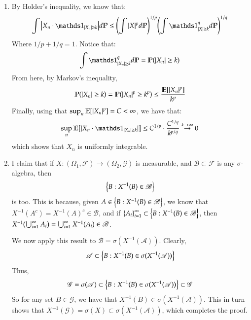 \documentclass[12pt]{article}
\theoremstyle{definitionstyle}
\def\mbb#1{\mathbb{#1}}
\newcommand{\SET}[1]{\Set{\mskip-\medmuskip #1 \mskip-\medmuskip}}
\newcommand{\1}{\mathds 1}
\renewcommand{\P}{\mathbb P \qty}
\newcommand{\E}{\mathbb E \qty}
\begin{document}
\begin{enumerate}
        \item By Holder's inequality, we know that:
        \begin{align*}
            \int \qty|X_n \cdot \1_{|X_n| \geq k}|d \mbb P \leq \qty(\int |X|^p d \mbb P)^{1/p} \qty(\int \1_{|X| \geq k}^q d\mbb P)^{1/q}
        \end{align*}
        Where $1/p + 1/q = 1$. Notice that:
        \begin{align*}
            \int \1_{|X_n| \geq k}^q d\mbb P = \P(|X_n| \geq k)
        \end{align*}
        From here, by Markov's inequality,
        \begin{align*}
            \P(|X_n| \geq k) = \P(|X_n|^p \geq k^p) \leq \frac{\E[|X_n|^p]}{k^p}
        \end{align*}
        Finally, using that $\sup_n \E[|X_n|^p] = C < \infty$, we have that:
        \begin{align*}
            \sup_n \E[|X_n \cdot \1_{|X_n| \geq k}|] \leq C^{1/p} \cdot \frac{C^{1/q}}{k^{p/q}} \overset{k \to \infty}{\to} 0
        \end{align*}
        which shows that $X_n$ is uniformly integrable.

        \item I claim that if $X: (\Omega_1, \mathscr F) \to (\Omega_2, \mathscr G)$ is measurable, and $\mathscr B \subset \mathscr F$ is any $\sigma$-algebra, then
        \begin{align*}
            \SET{B : X^{-1}(B) \in \mathscr B}
        \end{align*}
        is too. This is because, given $A \in \SET{B : X^{-1}(B) \in \mathscr B}$, we know that $X^{-1}(A^c) = X^{-1}(A)^c \in \mathscr B$, and if $\SET{A_i}_{i=1}^\infty \subset \SET{B : X^{-1}(B) \in \mathscr B}$, then $X^{-1}\qty(\bigcup_{i=1}^\infty A_i) = \bigcup_{i=1}^\infty X^{-1}(A_i) \in \mathscr B$.

        We now apply this result to $\mathscr B = \sigma(X^{-1}(\mathscr A))$. Clearly,
        \begin{align*}
            \mathscr A \subset \SET{B : X^{-1}(B) \in \mathscr \sigma(X^{-1}(\mathscr A))}
        \end{align*}
        Thus,
        \begin{align*}
            \mathscr G = \sigma(\mathscr A) \subset \SET{B : X^{-1}(B) \in \mathscr \sigma(X^{-1}(\mathscr A))} \subset \mathscr G
        \end{align*}
        So for any set $B \in \mathscr G$, we have that $X^{-1}(B) \in \sigma(X^{-1}(\mathscr A))$. This in turn shows that $X^{-1}(\mathscr G) = \sigma(X) \subset \sigma(X^{-1}(\mathscr A))$, which completes the proof.


\end{enumerate}
\end{document}
